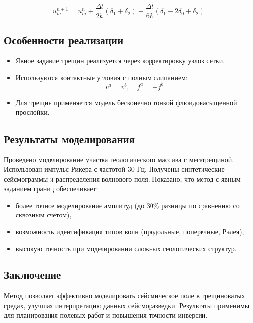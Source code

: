 \begin{equation}
u^{n+1}_m = u^n_m + \frac{\Delta t}{2h} (\delta_1 + \delta_2) + \frac{\Delta t}{6h} (\delta_1 - 2\delta_0 + \delta_2)
\end{equation}

\subsection*{Особенности реализации}
\begin{itemize}
  \item Явное задание трещин реализуется через корректировку узлов сетки.
  \item Используются контактные условия с полным слипанием:
  \[
  v^a = v^b, \quad f^a = -f^b
  \]
  \item Для трещин применяется модель бесконечно тонкой флюидонасыщенной прослойки.
\end{itemize}

\subsection*{Результаты моделирования}
Проведено моделирование участка геологического массива с мегатрещиной. Использован импульс Рикера с частотой 30 Гц. Получены синтетические сейсмограммы и распределения волнового поля. Показано, что метод с явным заданием границ обеспечивает:
\begin{itemize}
  \item более точное моделирование амплитуд (до 30\% разницы по сравнению со сквозным счётом),
  \item возможность идентификации типов волн (продольные, поперечные, Рэлея),
  \item высокую точность при моделировании сложных геологических структур.
\end{itemize}

\subsection*{Заключение}
Метод позволяет эффективно моделировать сейсмическое поле в трещиноватых средах, улучшая интерпретацию данных сейсморазведки. Результаты применимы для планирования полевых работ и повышения точности инверсии.


